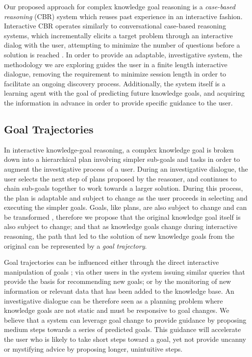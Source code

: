 \documentclass[letterpaper]{article}
\begin{document}
Our proposed approach for complex knowledge goal reasoning is a \textit{case-based reasoning} (CBR) \cite{kolodner_case-based_1993,lopez_de_mantaras_retrieval_2005} system which reuses past experience in an interactive fashion. Interactive CBR operates similarly to conversational case-based reasoning systems, which incrementally elicits a target problem through an interactive dialog with the user, attempting to minimize the number of questions before a solution is reached \cite{aha_advances_2005}. In order to provide an adaptable, investigative system, the methodology we are exploring guides the user in a finite length interactive dialogue, removing the requirement to minimize session length in order to facilitate an ongoing discovery process. Additionally, the system itself is a learning agent with the goal of predicting future knowledge goals, and acquiring the information in advance in order to provide specific guidance to the user.

\subsection{Goal Trajectories}

In interactive knowledge-goal reasoning, a complex knowledge goal is broken down into a hierarchical plan involving simpler sub-goals and tasks in order to augment the investigative process of a user. During an investigative dialogue, the user selects the next step of plans proposed by the reasoner, and continues to chain sub-goals together to work towards a larger solution. During this process, the plan is adaptable and subject to change as the user proceeds in selecting and executing the simpler goals. Goals, like plans, are also subject to change and can be transformed \cite{cox_goal_1998}, therefore we propose that the original knowledge goal itself is also subject to change; and that as knowledge goals change during interactive reasoning, the path that led to the solution of new knowledge goals from the original can be represented by a \textit{goal trajectory}.

Goal trajectories can be influenced either through the direct interactive manipulation of goals \cite{cox_mixed-initiative_2007}; via other users in the system issuing similar queries that provide the basis for recommending new goals; or by the monitoring of new information or relevant data that has been added to the knowledge base. An investigative dialogue can be therefore seen as a planning problem where knowledge goals are not static and must be responsive to goal changes. We believe that a system can leverage goal change to provide guidance by proposing medium steps towards a series of predicted goals. This guidance will accelerate the user who is likely to take short steps toward a goal, yet not provide uncanny or mystifying advice by proposing longer, unintuitive steps.
\end{document}
